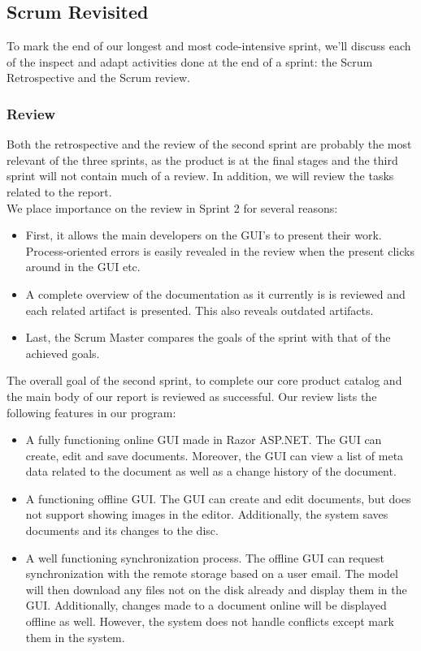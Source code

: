 \subsection{Scrum Revisited}
To mark the end of our longest and most code-intensive sprint, we'll discuss each of the inspect and adapt activities done at the end of a sprint: the Scrum Retrospective and the Scrum review.
\subsubsection{Review}
Both the retrospective and the review of the second sprint are probably the most relevant of the three sprints, as the product is at the final stages and the third sprint will not contain much of a review. In addition, we will review the tasks related to the report. \\
We place importance on the review in Sprint 2 for several reasons:
\begin{itemize}
\item First, it allows the main developers on the GUI's to present their work. Process-oriented errors is easily revealed in the review when the present clicks around in the GUI etc.
\item A complete overview of the documentation as it currently is is reviewed and each related artifact is presented. This also reveals outdated artifacts.
\item Last, the Scrum Master compares the goals of the sprint with that of the achieved goals. 
\end{itemize}
The overall goal of the second sprint, to complete our core product catalog and the main body of our report is reviewed as successful. Our review lists the following features in our program:
\begin{itemize}
\item A fully functioning online GUI made in Razor ASP.NET. The GUI can create, edit and save documents. Moreover, the GUI can view a list of meta data related to the document as well as a change history of the document.
\item A functioning offline GUI. The GUI can create and edit documents, but does not support showing images in the editor. Additionally, the system saves documents and its changes to the disc.
\item A well functioning synchronization process. The offline GUI can request synchronization with the remote storage based on a user email. The model will then download any files not on the disk already and display them in the GUI. Additionally, changes made to a document online will be displayed offline as well. However, the system does not handle conflicts except mark them in the system.
\end{itemize}
